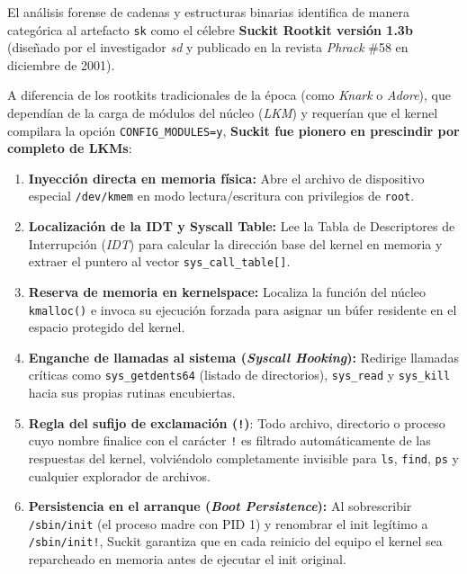 \begin{notaforense}
El análisis forense de cadenas y estructuras binarias identifica de manera categórica al artefacto \texttt{sk} como el célebre \textbf{Suckit Rootkit versión 1.3b} (diseñado por el investigador \textit{sd} y publicado en la revista \textit{Phrack} \#58 en diciembre de 2001). 

A diferencia de los rootkits tradicionales de la época (como \textit{Knark} o \textit{Adore}), que dependían de la carga de módulos del núcleo (\textit{LKM}) y requerían que el kernel compilara la opción \texttt{CONFIG\_MODULES=y}, \textbf{Suckit fue pionero en prescindir por completo de LKMs}:
\begin{enumerate}
    \item \textbf{Inyección directa en memoria física:} Abre el archivo de dispositivo especial \texttt{/dev/kmem} en modo lectura/escritura con privilegios de \texttt{root}.
    \item \textbf{Localización de la IDT y Syscall Table:} Lee la Tabla de Descriptores de Interrupción (\textit{IDT}) para calcular la dirección base del kernel en memoria y extraer el puntero al vector \texttt{sys\_call\_table[]}.
    \item \textbf{Reserva de memoria en kernelspace:} Localiza la función del núcleo \texttt{kmalloc()} e invoca su ejecución forzada para asignar un búfer residente en el espacio protegido del kernel.
    \item \textbf{Enganche de llamadas al sistema (\textit{Syscall Hooking}):} Redirige llamadas críticas como \texttt{sys\_getdents64} (listado de directorios), \texttt{sys\_read} y \texttt{sys\_kill} hacia sus propias rutinas encubiertas.
    \item \textbf{Regla del sufijo de exclamación (\texttt{!})}: Todo archivo, directorio o proceso cuyo nombre finalice con el carácter \texttt{!} es filtrado automáticamente de las respuestas del kernel, volviéndolo completamente invisible para \texttt{ls}, \texttt{find}, \texttt{ps} y cualquier explorador de archivos.
    \item \textbf{Persistencia en el arranque (\textit{Boot Persistence}):} Al sobrescribir \texttt{/sbin/init} (el proceso madre con PID 1) y renombrar el init legítimo a \texttt{/sbin/init!}, Suckit garantiza que en cada reinicio del equipo el kernel sea reparcheado en memoria antes de ejecutar el init original.
\end{enumerate}
\end{notaforense}


